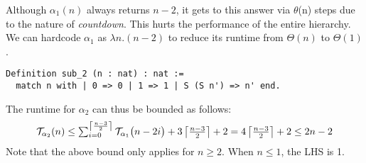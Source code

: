 
Although $\alpha_1 (n)$ always returns $n-2$, it gets to this answer
via $\theta$(n) steps due to the nature of \emph{countdown}.
This hurts the performance of the entire hierarchy. 
We can hardcode $\alpha_1$ as $\lambda n.(n-2)$ to reduce its runtime
from $\Theta(n)$ to $\Theta(1)$.
\begin{lstlisting}
Definition sub_2 (n : nat) : nat :=
  match n with | 0 => 0 | 1 => 1 | S (S n') => n' end.
\end{lstlisting}
The runtime for $\alpha_2$ can thus be bounded as follows:
\begin{equation*}
\mathcal{T}_{\alpha_2}(n)
 \le \textstyle \sum_{i=0}^{\left\lceil \frac{n-3}{2} \right\rceil} \mathcal{T}_{\alpha_1}\big(n-2i\big) + 3\left\lceil \frac{n-3}{2} \right\rceil + 2  =  4\left\lceil \frac{n-3}{2} \right\rceil + 2
 \le 2n - 2
\end{equation*}
Note that the above bound only applies for $n\ge 2$. When $n\le 1$, the LHS is 1.

